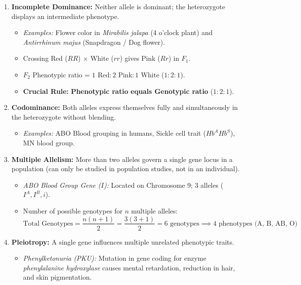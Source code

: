 \documentclass[10pt,a4paper]{article}
\begin{document}
\begin{conceptbox}
\begin{enumerate}[leftmargin=*]
  \item \textbf{Incomplete Dominance:} Neither allele is dominant; the heterozygote displays an intermediate phenotype.
  \begin{itemize}
    \item \textit{Examples:} Flower color in \textit{Mirabilis jalapa} (4 o'clock plant) and \textit{Antirrhinum majus} (Snapdragon / Dog flower).
    \item Crossing Red ($RR$) $\times$ White ($rr$) gives Pink ($Rr$) in $F_1$.
    \item $F_2$ Phenotypic ratio = $1\text{ Red} : 2\text{ Pink} : 1\text{ White}$ ($1:2:1$).
    \item \textbf{Crucial Rule:} \textbf{Phenotypic ratio equals Genotypic ratio} ($1 : 2 : 1$).
  \end{itemize}
  \item \textbf{Codominance:} Both alleles express themselves fully and simultaneously in the heterozygote without blending.
  \begin{itemize}
    \item \textit{Examples:} ABO Blood grouping in humans, Sickle cell trait ($Hb^A Hb^S$), MN blood group.
  \end{itemize}
  \item \textbf{Multiple Allelism:} More than two alleles govern a single gene locus in a population (can only be studied in population studies, not in an individual).
  \begin{itemize}
    \item \textit{ABO Blood Group Gene ($I$):} Located on Chromosome 9; 3 alleles ($I^A, I^B, i$).
    \item Number of possible genotypes for $n$ multiple alleles:
    \begin{equation}
      \text{Total Genotypes} = \frac{n(n+1)}{2} = \frac{3(3+1)}{2} = 6 \text{ genotypes} \implies 4 \text{ phenotypes (A, B, AB, O)}
    \end{equation}
  \end{itemize}
  \item \textbf{Pleiotropy:} A single gene influences multiple unrelated phenotypic traits.
  \begin{itemize}
    \item \textit{Phenylketonuria (PKU):} Mutation in gene coding for enzyme \textit{phenylalanine hydroxylase} causes mental retardation, reduction in hair, and skin pigmentation.

\end{itemize}
\end{enumerate}
\end{conceptbox}
\end{document}
